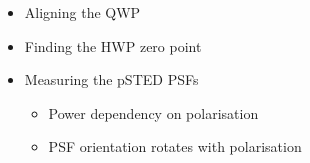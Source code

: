 \begin{itemize}
	\item Aligning the QWP
	\item Finding the HWP zero point
	\item Measuring the pSTED PSFs
	\begin{itemize}
		\item Power dependency on polarisation
		\item PSF orientation rotates with polarisation
	\end{itemize}
\end{itemize}





























